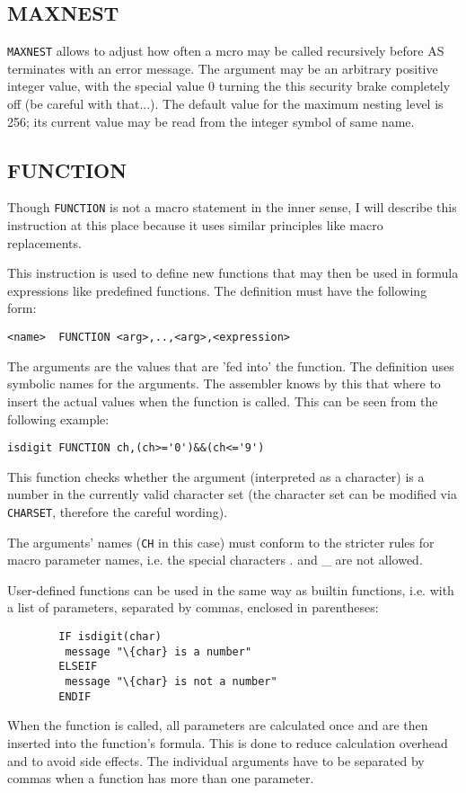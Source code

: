 \documentclass[12pt,twoside]{report}
\makeatletter
\newcommand{\tty}[1]{{\tt #1}}
\newcommand{\ttindex}[1]{\index{#1@{\tt #1}}}
\makeatother
\begin{document}
\subsection{MAXNEST}
\ttindex{MAXNEST}

{\tt MAXNEST} allows to adjust how often a mcro may be called recursively
before AS terminates with an error message.  The argument may be an
arbitrary positive integer value, with the special value 0 turning the
this security brake completely off (be careful with that...).  The default
value for the maximum nesting level is 256; its current value may be read
from the integer symbol of same name.


\subsection{FUNCTION}
\label{SectFUNCTION}
\ttindex{FUNCTION}

Though \tty{FUNCTION} is not a macro statement in the inner sense, I will
describe this instruction at this place because it uses similar principles
like macro replacements.

This instruction is used to define new functions that may then be
used in formula expressions like predefined functions.  The
definition must have the following form:
\begin{verbatim}
<name>  FUNCTION <arg>,..,<arg>,<expression>
\end{verbatim}
The arguments are the values that are 'fed into' the function.  The
definition uses symbolic names for the arguments.  The assembler
knows by this that where to insert the actual values when the
function is called.  This can be seen from the following example:
\begin{verbatim}
isdigit FUNCTION ch,(ch>='0')&&(ch<='9')
\end{verbatim}
This function checks whether the argument (interpreted as a character) is
a number in the currently valid character set (the character set can be
modified via \tty{CHARSET}, therefore the careful wording).

The arguments' names (\tty{CH} in this case) must conform to the stricter
rules for macro parameter names, i.e. the special characters . and \_
are not allowed.

User-defined functions can be used in the same way as builtin
functions, i.e. with a list of parameters, separated by commas,
enclosed in parentheses:
\begin{verbatim}
        IF isdigit(char)
         message "\{char} is a number"
        ELSEIF
         message "\{char} is not a number"
        ENDIF
\end{verbatim}
When the function is called, all parameters are calculated once and
are then inserted into the function's formula.  This is done to
reduce calculation overhead and to avoid side effects.  The
individual arguments have to be separated by commas when a function
has more than one parameter.
\end{document}
